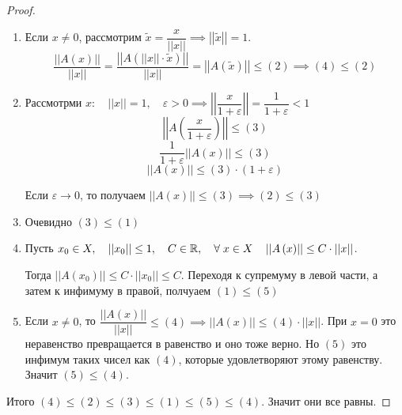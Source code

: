 \documentclass[../main.tex]{subfiles}
\begin{document}
\begin{proof}
    
    ~

    \begin{enumerate}
        \item Если \( x \neq 0\), рассмотрим \( \tilde{ x}= \dfrac{ x}{ \left| \left| x\right|\right|} \implies \left| \left| \tilde{ x}\right|\right|=1\).
        \[ \dfrac{ \left|\left|A\left(x\right)\right|\right|}{ \left| \left| x\right|\right|} = \dfrac{ \left|\left|A\left(\left|\left|x\right|\right|\cdot\tilde{x}\right)\right|\right|}{ \left| \left| x\right|\right|} = \left| \left| A\left( \tilde{ x}\right)\right|\right| \leq \left( 2\right) \implies \left( 4\right) \leq \left( 2\right)\]
        \item Рассмотрми \(x :\quad \left| \left| x\right|\right|=1,\quad \varepsilon >0 \implies \left| \left| \dfrac{ x}{ 1+ \varepsilon } \right|\right|= \dfrac{ 1}{ 1+ \varepsilon } < 1\)
        \[ \left| \left| A\left( \dfrac{ x}{ 1 + \varepsilon }\right)\right|\right| \leq  \left( 3\right)\]
        \[ \dfrac{ 1}{ 1+ \varepsilon } \left| \left| A\left( x\right)\right|\right| \leq  \left( 3\right) \]
        \[ \left| \left| A\left( x\right)\right|\right| \leq  \left( 3\right)\cdot\left( 1+ \varepsilon \right)\]
        \par Если \( \varepsilon \longrightarrow 0\), то получаем \( \left| \left| A\left( x\right)\right|\right| \leq \left( 3\right) \implies \left( 2\right) \leq \left( 3\right)\)
        \item Очевидно \( \left( 3\right) \leq \left( 1\right)\)
        \item Пусть \( x_0 \in X,\quad \left| \left| x_0\right|\right| \leq 1,\quad C \in \mathbb{R},\quad \forall \; x \in X\quad \left| \left| A\left( x\right)\right|\right| \leq C\cdot \left| \left| x\right|\right|\). 
        \par Тогда \( \left| \left| A\left( x_0\right)\right|\right| \leq C\cdot \left| \left| x_0\right|\right| \leq C\). Переходя к супремуму в левой части, а затем к инфимуму в правой, полчуаем \( \left( 1\right) \leq \left( 5\right)\)
        \item Если \( x \neq 0\), то \( \dfrac{ \left|\left|A\left(x\right)\right|\right|}{ \left| \left| x\right|\right|} \leq \left( 4\right) \implies \left| \left| A\left( x\right)\right|\right| \leq \left( 4\right)\cdot \left| \left| x\right|\right|\). При \( x=0\) это неравенство превращается в равенство и оно тоже верно. Но \( \left( 5\right)\) это инфимум таких чисел как \( \left( 4\right)\), которые удовлетворяют этому равенству. Значит \( \left( 5\right) \leq \left( 4\right)\).
    \end{enumerate}

    Итого \( \left( 4\right) \leq \left( 2\right) \leq \left( 3\right) \leq \left( 1\right) \leq \left( 5\right) \leq \left( 4\right)\). Значит они все равны. 
\end{proof}
\end{document}
